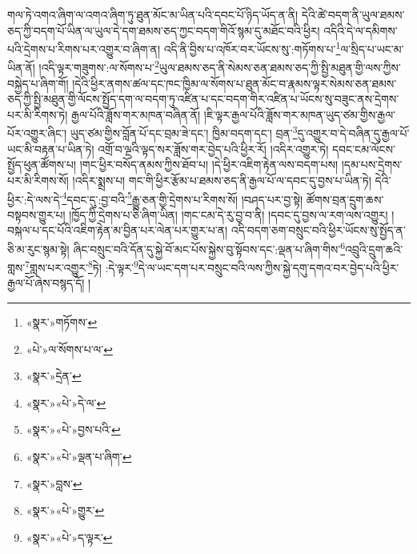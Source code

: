 གལ་ཏེ་འགའ་ཞིག་ལ་འགའ་ཞིག་ཏུ་ཐུན་མོང་མ་ཡིན་པའི་དབང་པོ་ཉིད་ཡོད་ན་ནི། དེའི་ཚེ་བདག་ནི་ཡུལ་ཐམས་ཅད་ཀྱི་བདག་པོ་ཡིན་ལ་ཡུལ་དེ་དག་ཐམས་ཅད་ཀྱང་བདག་གིའོ་སྙམ་དུ་མཐོང་བའི་ཕྱིར། འདིའི་དེ་ལ་དམིགས་པའི་དྲེགས་པ་རིགས་པར་འགྱུར་བ་ཞིག་ན། འདི་ནི་བྱིས་པ་འཁོར་བར་ཡོངས་སུ་:གཏོགས་པ་\footnote{«སྣར་»གཏོགས་}ལ་སྲིད་པ་ཡང་མ་ཡིན་ནོ། །འདི་ལྟར་གཟུགས་:ལ་སོགས་པ་\footnote{«པེ་»ལ་སོགས་པ་ལ་}ཡུལ་ཐམས་ཅད་ནི་སེམས་ཅན་ཐམས་ཅད་ཀྱི་སྤྱི་མཐུན་གྱི་ལས་ཀྱིས་བསྐྱེད་པ་ཞིག་གོ། །དེའི་ཕྱིར་ནགས་ཚལ་དང་ཁང་ཁྱིམ་ལ་སོགས་པ་ཐུན་མོང་བ་རྣམས་ལྟར་སེམས་ཅན་ཐམས་ཅད་ཀྱི་སྤྱི་མཐུན་གྱི་ལོངས་སྤྱོད་དག་ལ་བདག་ཏུ་འཛིན་པ་དང་བདག་གིར་འཛིན་པ་ཡོངས་སུ་བཟུང་ནས་དྲེགས་པར་མི་རིགས་ཏེ། རྒྱལ་པོའི་ཟློས་གར་མཁན་བཞིན་ནོ། །ཇི་ལྟར་རྒྱལ་པོའི་ཟློས་གར་མཁན་ཡུད་ཙམ་གྱིས་རྒྱལ་པོར་འགྱུར་ཞིང་། ཡུད་ཙམ་གྱིས་བློན་པོ་དང་བྲམ་ཟེ་དང་། ཁྱིམ་བདག་དང་། བྲན་\footnote{«སྣར་»དྲེན་}དུ་འགྱུར་བ་དེ་བཞིན་དུ་རྒྱལ་པོ་ཡང་མི་བརྟན་པ་ཡིན་ཏེ། འགྲོ་བ་ལྔའི་ལྟད་སར་ཟློས་གར་བྱེད་པའི་ཕྱིར་རོ། །འདིར་འགྱུར་ཏེ། དབང་ངམ་ལོངས་སྤྱོད་ཕུན་ཚོགས་པ། །གང་ཕྱིར་བསོད་ནམས་ཀྱིས་ཐོབ་པ། །དེ་ཕྱིར་འཇིག་རྟེན་ལས་བདག་པས། །དམ་པས་དྲེགས་པར་མི་རིགས་སོ། །འདིར་སྨྲས་པ། གང་གི་ཕྱིར་རྩོམ་པ་ཐམས་ཅད་ནི་རྒྱལ་པོ་ལ་དབང་དུ་བྱས་པ་ཡིན་ཏེ། དེའི་ཕྱིར་:དེ་ལས་དེ་\footnote{«སྣར་»«པེ་»དེ་ལ་}དབང་དུ་:བྱ་བའི་\footnote{«སྣར་»«པེ་»བྱས་པའི་}རྒྱུ་ཅན་གྱི་དྲེགས་པ་རིགས་སོ། །བཤད་པར་བྱ་སྟེ། ཚོགས་བྲན་དྲུག་ཆས་བསྟབས་གྱུར་པ། །ཁྱོད་ཀྱི་དྲེགས་པ་ཅི་ཞིག་ཡིན། །གང་ངམ་དེ་རུ་བྱ་བ་ནི། །དབང་དུ་བྱས་ལ་རག་ལས་འགྱུར། །བསྐལ་པ་དང་པོའི་འཇིག་རྟེན་མ་བྱིན་པར་ལེན་པར་གྱུར་པ་ན། འདི་བདག་ཅག་བསྲུང་བའི་ཕྱིར་ཡོངས་སུ་སྤྱོད་ན་ཅི་མ་རུང་སྙམ་སྟེ། ཞིང་བསྲུང་བའི་དོན་དུ་སྐྱེ་བོ་མང་པོས་སྐྱེས་བུ་སྟོབས་དང་:ལྡན་པ་ཞིག་གིས་\footnote{«སྣར་»«པེ་»ལྡན་པ་ཞིག་}འབྲུའི་དྲུག་ཆའི་གླས་\footnote{«སྣར་»བླས་}གླས་པར་འགྱུར་\footnote{«སྣར་»«པེ་»གྱུར་}ཏེ། :དེ་ལྟར་\footnote{«སྣར་»«པེ་»ད་ལྟར་}དེ་ལ་ཡང་དག་པར་བསྲུང་བའི་ལས་ཀྱིས་སྐྱེ་དགུ་དགའ་བར་བྱེད་པའི་ཕྱིར་རྒྱལ་པོ་ཞེས་བསྙད་དོ། །
